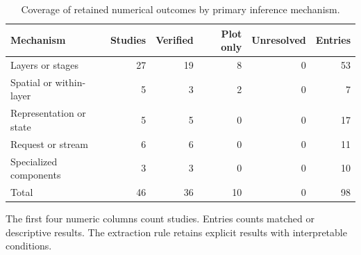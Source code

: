 \begin{table}[tbp]
\caption{Coverage of retained numerical outcomes by primary inference mechanism.}\label{tab:coverage}
\centering\small\setlength{\tabcolsep}{4pt}
\begin{tabular}{@{}p{.31\linewidth}rrrrr@{}}
\toprule
Mechanism & Studies & Verified & Plot only & Unresolved & Entries \\
\midrule
Layers or stages & 27 & 19 & 8 & 0 & 53 \\
Spatial or within-layer & 5 & 3 & 2 & 0 & 7 \\
Representation or state & 5 & 5 & 0 & 0 & 17 \\
Request or stream & 6 & 6 & 0 & 0 & 11 \\
Specialized components & 3 & 3 & 0 & 0 & 10 \\
Total & 46 & 36 & 10 & 0 & 98 \\
\bottomrule
\end{tabular}
\par\smallskip\raggedright The first four numeric columns count studies. Entries counts matched or descriptive results. The extraction rule retains explicit results with interpretable conditions.
\end{table}

